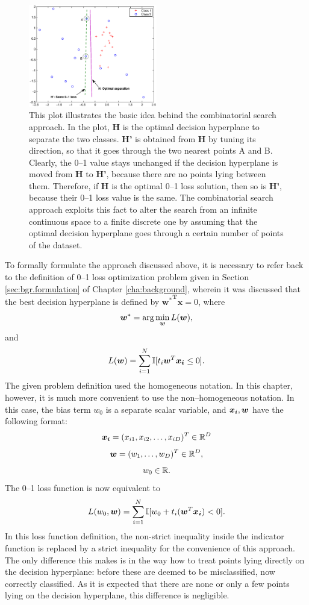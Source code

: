 \begin{figure}[here]
\includegraphics[width=0.50\textwidth]{images/fig41_intro.eps}
\caption{ This plot illustrates the basic idea behind the
  combinatorial search approach. In the plot, {\bf H} is the optimal
  decision hyperplane to separate the two classes. {\bf H'} is
  obtained from {\bf H} by tuning its direction, so that it goes
  through the two nearest points A and B. Clearly, the 0--1 value
  stays unchanged if the decision hyperplane is moved from {\bf H} to
  {\bf H'}, because there are no points lying between them. Therefore,
  if {\bf H} is the optimal 0--1 loss solution, then so is {\bf H'},
  because their 0--1 loss value is the same. The combinatorial search
  approach exploits this fact to alter the search from an infinite
  continuous space to a finite discrete one by assuming that the
  optimal decision hyperplane goes through a certain number of points
  of the dataset.  }
\label{fig:cs_intro}
\end{figure}

To formally formulate the approach discussed above, it is necessary to
refer back to the definition of 0--1 loss optimization problem given
in Section \ref{sec:bgr.formulation} of Chapter \ref{cha:background},
wherein it was discussed that the best decision hyperplane is defined
by $\boldsymbol{{w^*}^Tx}=0$, where
$${\boldsymbol{w}}^* = \arg\min_{\boldsymbol{w}} L({\boldsymbol{w}}),$$ 
and 
$$L(\boldsymbol{w}) = \sum_{i=1}^N \mathbb{I} [t_i \boldsymbol{w}^T \boldsymbol{x_i} \leq 0].$$ The given
problem definition used the homogeneous notation. In this chapter,
however, it is much more convenient to use the non--homogeneous
notation. In this case, the bias term $w_0$ is a separate scalar
variable, and $\boldsymbol{x_i}, \boldsymbol{w}$ have the following format:
$$\boldsymbol{x_i} =  (x_{i1}, x_{i2}, \dots, x_{iD})^T \in \mathbb{R}^{D}$$
$$\boldsymbol{w} = (w_1, \dots, w_D)^T \in \mathbb{R}^{D},$$
$$w_0 \in \mathbb{R}.$$ 
The 0--1 loss function is now equivalent to 
\begin{equation}\label{eq:loss}
L(w_0,\boldsymbol{w}) = \sum_{i=1}^N \mathbb{I} [w_0 + t_i (\boldsymbol{w}^T \boldsymbol{x_i}) < 0].
\end{equation}
In this loss function definition, the non-strict inequality inside the
indicator function is replaced by a strict inequality for the
convenience of this approach. The only difference this makes is in the
way how to treat points lying directly on the decision hyperplane:
before these are deemed to be misclassified, now correctly
classified. As it is expected that there are none or only a few points
lying on the decision hyperplane, this difference is negligible.

